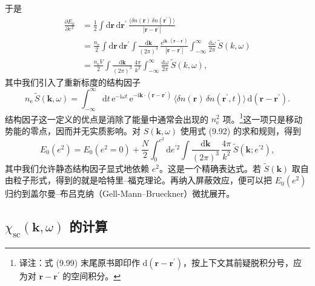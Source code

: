 于是
\begin{equation*}
\begin{aligned}
\frac{\partial E_0}{\partial e^2}&=\frac{1}{2}\int\mathrm{d}\mathbf{r}\,\mathrm{d}\mathbf{r}^{\prime}\,\frac{\langle\delta n(\mathbf{r})\,\delta n(\mathbf{r}^{\prime})\rangle}{|\mathbf{r}-\mathbf{r}^{\prime}|}\\
&=\frac{n_{\mathrm{e}}}{2}\int\mathrm{d}\mathbf{r}\,\mathrm{d}\mathbf{r}^{\prime}\int\frac{\mathrm{d}\mathbf{k}}{(2\pi)^3}\,\frac{\mathrm{e}^{\mathrm{i}\mathbf{k}\cdot(\mathbf{r}-\mathbf{r}^{\prime})}}{|\mathbf{r}-\mathbf{r}^{\prime}|}\int_{-\infty}^{\infty}\frac{\mathrm{d}\omega}{2\pi}\,\tilde{S}(k,\omega)\\
&=\frac{n_{\mathrm{e}}V}{2}\int\frac{\mathrm{d}\mathbf{k}}{(2\pi)^3}\,\frac{4\pi}{k^2}\int_{-\infty}^{\infty}\frac{\mathrm{d}\omega}{2\pi}\,\tilde{S}(k,\omega),
\end{aligned}\tag{9.98}
\end{equation*}
其中我们引入了重新标度的结构因子
\begin{equation*}
n_{\mathrm{e}}\,\tilde{S}(\mathbf{k},\omega)=\int_{-\infty}^{\infty}\mathrm{d}t\,\mathrm{e}^{-\mathrm{i}\omega t}\,\mathrm{e}^{-\mathrm{i}\mathbf{k}\cdot(\mathbf{r}-\mathbf{r}^{\prime})}\,\langle\delta n(\mathbf{r})\,\delta n(\mathbf{r}^{\prime},t)\rangle\,\mathrm{d}(\mathbf{r}-\mathbf{r}^{\prime}).\tag{9.99}
\end{equation*}
结构因子这一定义的优点是消除了能量中通常会出现的 $n_{\mathrm{e}}^2$ 项。\footnote{译注：式 (9.99) 末尾原书即印作 $\mathrm{d}(\mathbf{r}-\mathbf{r}^{\prime})$，按上下文其前疑脱积分号，应为对 $\mathbf{r}-\mathbf{r}^{\prime}$ 的空间积分。}这一项只是移动势能的零点，因而并无实质影响。对 $S(\mathbf{k},\omega)$ 使用式 (9.92) 的求和规则，得到
\begin{equation*}
E_0(e^2)=E_0(e^2=0)+\frac{N}{2}\int_{0}^{e^2}\mathrm{d}e^{\prime 2}\int\frac{\mathrm{d}\mathbf{k}}{(2\pi)^3}\,\frac{4\pi}{k^2}\,\tilde{S}(\mathbf{k};e^{\prime 2}),\tag{9.100}
\end{equation*}
其中我们允许静态结构因子显式地依赖 $e^2$。这是一个精确表达式。若 $\tilde{S}(\mathbf{k})$ 取自由粒子形式，得到的就是哈特里–福克理论。再纳入屏蔽效应，便可以把 $E_0(e^2)$ 归约到盖尔曼–布吕克纳（Gell-Mann--Brueckner）微扰展开。

\subsection{$\chi_{\mathrm{sc}}(\mathbf{k},\omega)$ 的计算}

